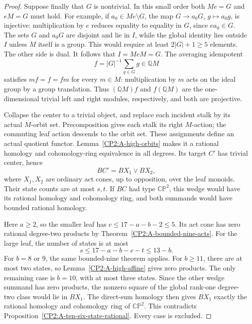 \begin{proof}
Suppose finally that $G$ is nontrivial. In this small order both
$Me=G$ and $eM=G$ must hold. For example, if $a_0\in Me\setminus G$,
the map $G\to a_0G$, $g\mapsto a_0g$, is injective: multiplication
by $e$ reduces equality to equality in $G$, since $ea_0\in G$.
The sets $G$ and $a_0G$ are disjoint and lie in $I$, while the global
identity lies outside $I$ unless $M$ itself is a group. This would
require at least $2|G|+1\geq5$ elements. The other side is dual.
It follows that $I=MeM=G$. The averaging idempotent
\[
 f=|G|^{-1}\sum_{g\in G}g\in\mathbb QM
\]
satisfies $mf=f=fm$ for every $m\in M$: multiplication by $m$
acts on the ideal group by a group translation. Thus
$(\mathbb QM)f$ and $f(\mathbb QM)$ are the one-dimensional trivial
left and right modules, respectively, and both are projective.

Collapse the center to a trivial object, and replace each incident
stalk by its actual $M$-orbit set. Precomposition gives each stalk
its right $M$-action; the commuting leaf action descends to the
orbit set. These assignments define an actual quotient functor.
Lemma~\ref{CP2:A-high-orbits} makes it a rational homology and
cohomology-ring equivalence in all degrees. Its target $C'$ has
trivial center, hence
\[
 BC'=BX_1\vee BX_2,
\]
where $X_1,X_2$ are ordinary act cones, up to opposition, over the
leaf monoids. Their state counts are at most $s,t$. If $BC$ had
type $\mathbb{CP}^2$, this wedge would have its rational homology
and cohomology ring, and both summands would have bounded rational
homology.

Here $a\geq2$, so the smaller leaf has
$c\leq17-a-b-2\leq5$. Its act cone has zero rational degree-two
products by Theorem~\ref{CP2:A-bounded-nine-acts}. For the large
leaf, the number of states is at most
\[
 s\leq17-a-b-c-t\leq13-b.
\]
For $b=8$ or $9$, the same bounded-nine theorem applies. For
$b\geq11$, there are at most two states, so
Lemma~\ref{CP2:A-high-affine} gives zero products. The only remaining
case is $b=10$, with at most three states. Since the other wedge
summand has zero products, the nonzero square of the global
rank-one degree-two class would lie in $BX_1$. The direct-sum
homology then gives $BX_1$ exactly the rational homology and
cohomology ring of $\mathbb{CP}^2$. This contradicts
Proposition~\ref{CP2:A-ten-six-state-rational}. Every case is excluded.
\end{proof}
